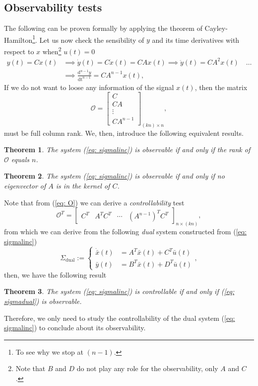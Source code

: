 \documentclass[11pt,a4paper,titlepage]{article}
\newtheorem{theorem}{Theorem}
\begin{document}
\subsection{Observability tests}
The following can be proven formally by applying the theorem of Cayley-Hamilton\footnote{To see why we stop at $(n-1)$.}. Let us now check the sensibility of $y$ and its time derivatives with respect to $x$ when\footnote{Note that $B$ and $D$ do not play any role for the observability, only $A$ and $C$.} $u(t)=0$
\begin{align}
	y(t) = Cx(t) &\implies \dot y(t) = C\dot x(t) = CAx(t) \implies \ddot y(t) = C A^2 x(t) \quad \dots \nonumber \\ &\implies \frac{\mathrm{d}^{n-1}y}{\mathrm{dt}^{n-1}} = CA^{n-1}x(t), \nonumber
\end{align}
If we do not want to loose any information of the signal $x(t)$, then the matrix
\begin{equation}
	\mathcal{O} = \begin{bmatrix}C \\ CA \\ \vdots \\ CA^{n-1}\end{bmatrix}_{(kn)\times n}, \label{eq: O}
\end{equation}
must be full column rank. We, then, introduce the following equivalent results.
\begin{theorem}
	The system (\ref{eq: sigmalinc}) is observable if and only if the rank of $\mathcal{O}$ equals $n$.
\end{theorem}
\begin{theorem}
The system (\ref{eq: sigmalinc}) is observable if and only if no eigenvector of $A$ is in the kernel of $C$.
\end{theorem}

Note that from (\ref{eq: O}) we can derive a \emph{controllability} test
\begin{equation}
	\mathcal{O}^T = \begin{bmatrix}C^T & A^TC^T & \cdots & (A^{n-1})^TC^T \end{bmatrix}_{n \times (kn)}, 
\end{equation}
from which we can derive from the following \emph{dual} system constructed from (\ref{eq: sigmalinc})
\begin{equation}
	\Sigma_{\text{dual}} := \begin{cases}
		\dot{\bar x}(t) &= A^T \bar x(t) + C^T \bar u(t) \\
		\bar y(t) &= B^T\bar x(t) + D^T\bar u(t)
	\end{cases},
\label{eq: sigmadual}
\end{equation}
then, we have the following result
\begin{theorem}
	The system (\ref{eq: sigmalinc}) is controllable if and only if (\ref{eq: sigmadual}) is observable.
\end{theorem}
Therefore, we only need to study the controllability of the dual system (\ref{eq: sigmalinc}) to conclude about its observability.
\end{document}
